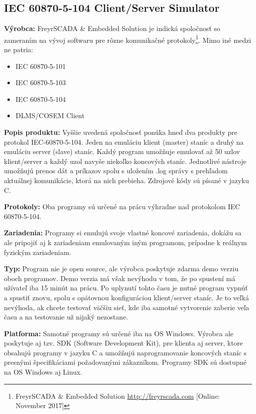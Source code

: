 \subsection{IEC 60870-5-104 Client/Server Simulator}
\textbf{Výrobca:} FreyrSCADA \& Embedded Solution je indická spoločnosť so zameraním na vývoj softwaru pre rôzne komunikačné protokoly\footnote{FreyrSCADA \& Embedded Solution \url{http://freyrscada.com} [Online: November 2017]}. Mimo iné medzi ne patria:
\begin{itemize}
\item IEC 60870-5-101
\item IEC 60870-5-103
\item IEC 60870-5-104
\item DLMS/COSEM Client
\end{itemize}
\noindent \textbf{Popis produktu:} Vyššie uvedená spoločnosť ponúka hneď dva produkty pre protokol IEC-60870-5-104. Jeden na emuláciu klient (master) staníc a druhý na emuláciu server (slave) staníc. Každý program umožňuje emulovať až 50 uzlov klient/server a každý uzol navyše niekoľko koncových staníc. Jednotlivé nástroje umožňujú prenos dát a príkazov spolu s uložením .log správy s prehľadom aktuálnej komunikácie, ktorá na nich prebieha. Zdrojové kódy sú písané v jazyku C. \par
\noindent \textbf{Protokoly:} Oba programy sú určené na prácu výhradne nad protokolom IEC 60870-5-104. \par
\noindent \textbf{Zariadenia:} Programy si emulujú svoje vlastné koncové zariadenia, dokážu sa ale pripojiť aj k zariadeniam emulovaným iným programom, prípadne k reálnym fyzickým zariadeniam. \par
\noindent \textbf{Typ:} Program nie je open source, ale výrobca poskytuje zdarma demo verziu oboch programov. Demo verzia má však nevýhodu v tom, že po spustení má užívateľ iba 15 minút na prácu. Po uplynutí tohto času je nutné program vypnúť a spustiť znovu, spolu s opätovnou konfiguráciou klient/server staníc. Je to veľká nevýhoda, ak chcete testovať väčšiu sieť, kde iba samotné vytvorenie zaberie veľa času a na testovanie už nijaký nezostane. \par
\noindent \textbf{Platforma:} Samotné programy sú určené iba na OS Windows. Výrobca ale poskytuje aj tzv. SDK (Software Development Kit), pre klienta aj server, ktore obsahujú programy v jazyku C a umožňujú naprogramovanie koncových staníc s presnými špecifikáciami požadovanými zákazníkom. Programy SDK sú dostupné na OS Windows aj Linux. \par
